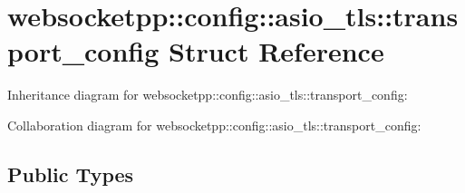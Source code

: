 \hypertarget{structwebsocketpp_1_1config_1_1asio__tls_1_1transport__config}{}\section{websocketpp\+:\+:config\+:\+:asio\+\_\+tls\+:\+:transport\+\_\+config Struct Reference}
\label{structwebsocketpp_1_1config_1_1asio__tls_1_1transport__config}


Inheritance diagram for websocketpp\+:\+:config\+:\+:asio\+\_\+tls\+:\+:transport\+\_\+config\+:


Collaboration diagram for websocketpp\+:\+:config\+:\+:asio\+\_\+tls\+:\+:transport\+\_\+config\+:
\subsection*{Public Types}
